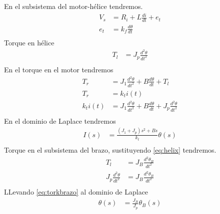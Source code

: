 \documentclass[a4paper]{IEEEtran} %
\begin{document}
En el subsistema del motor-hélice tendremos.
\begin{equation}
    \begin{split}
        V_{s}&=R_{i}+L\frac{di}{dt}+e_{t}\\
        e_{t}&=k_{f}\frac{d\theta}{dt}\\
    \end{split}
    \label{eq:motor}
\end{equation}
Torque en hélice
\begin{equation}
    \begin{split}
        T_{l}&=J_{p}\frac{d^2\theta}{dt^2}\\
    \end{split}
    \label{eq:helix}
\end{equation}
En el torque en el motor tendremos
\begin{equation}
    \begin{split}
        T_{r}&=J_{1}\frac{d^2\theta}{dt^2}+B\frac{d\theta}{dt}+T_{l}\\
        T_{r}&=k_{t}i(t)\\
        k_{t}i(t)&=J_{1}\frac{d^2\theta}{dt^2}+B\frac{d\theta}{dt}+J_{p}\frac{d^2\theta}{dt^2}\\
    \end{split}
        \label{eq:motortork}
\end{equation}
En el dominio de Laplace tendremos
\begin{equation}
    \begin{split}
        I(s)&=\frac{(J_{1}+J_{p})s^2 +Bs}{k_{t}}\theta(s)\\
    \end{split}
    \label{eq:laplas}
\end{equation}
Torque en el subsistema del brazo, sustituyendo \ref{eq:helix} tendremos.
\begin{equation}
    \begin{split}
        T_{l}&=J_{B}\frac{d^2\theta_{B}}{dt^2}\\
        J_{p}\frac{d^2\theta}{dt^2}&=J_{B}\frac{d^2\theta_{B}}{dt^2}\\
    \end{split}
    \label{eq:torkbrazo}
\end{equation}
LLevando \ref{eq:torkbrazo} al dominio de Laplace 
\begin{equation}
    \begin{split}
        \theta(s)&=\frac{J_{B}}{J_{p}}\theta_{B}(s)\\
    \end{split}
    \label{eq:torkbrazoplace}
\end{equation}
\end{document}
